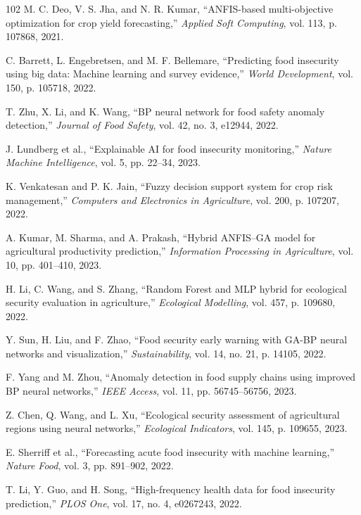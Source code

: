 \documentclass[preprint,12pt]{elsarticle}
\begin{document}
\begin{thebibliography}{102}
		M. C. Deo, V. S. Jha, and N. R. Kumar, ``ANFIS-based multi-objective optimization for crop yield forecasting,'' \emph{Applied Soft Computing}, vol. 113, p. 107868, 2021.
		
		C. Barrett, L. Engebretsen, and M. F. Bellemare, ``Predicting food insecurity using big data: Machine learning and survey evidence,'' \emph{World Development}, vol. 150, p. 105718, 2022.
		
		T. Zhu, X. Li, and K. Wang, ``BP neural network for food safety anomaly detection,'' \emph{Journal of Food Safety}, vol. 42, no. 3, e12944, 2022.
		
		J. Lundberg et al., ``Explainable AI for food insecurity monitoring,'' \emph{Nature Machine Intelligence}, vol. 5, pp. 22--34, 2023.
		
		K. Venkatesan and P. K. Jain, ``Fuzzy decision support system for crop risk management,'' \emph{Computers and Electronics in Agriculture}, vol. 200, p. 107207, 2022.
		
		A. Kumar, M. Sharma, and A. Prakash, ``Hybrid ANFIS--GA model for agricultural productivity prediction,'' \emph{Information Processing in Agriculture}, vol. 10, pp. 401--410, 2023.
		
		H. Li, C. Wang, and S. Zhang, ``Random Forest and MLP hybrid for ecological security evaluation in agriculture,'' \emph{Ecological Modelling}, vol. 457, p. 109680, 2022.
		
		Y. Sun, H. Liu, and F. Zhao, ``Food security early warning with GA-BP neural networks and visualization,'' \emph{Sustainability}, vol. 14, no. 21, p. 14105, 2022.
		
		F. Yang and M. Zhou, ``Anomaly detection in food supply chains using improved BP neural networks,'' \emph{IEEE Access}, vol. 11, pp. 56745--56756, 2023.
		
		Z. Chen, Q. Wang, and L. Xu, ``Ecological security assessment of agricultural regions using neural networks,'' \emph{Ecological Indicators}, vol. 145, p. 109655, 2023.
		
		E. Sherriff et al., ``Forecasting acute food insecurity with machine learning,'' \emph{Nature Food}, vol. 3, pp. 891--902, 2022.
		
		T. Li, Y. Guo, and H. Song, ``High-frequency health data for food insecurity prediction,'' \emph{PLOS One}, vol. 17, no. 4, e0267243, 2022.
		

\end{thebibliography}
\end{document}
